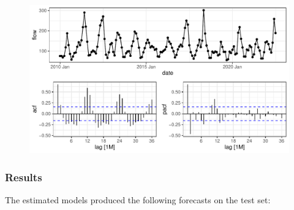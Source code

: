 \documentclass[
  letterpaper,
  DIV=11,
  numbers=noendperiod]{scrartcl}
\let\oldparagraph\paragraph
\renewcommand{\paragraph}[1]{\oldparagraph{#1}\mbox{}}
\begin{document}
\begin{figure}[H]

{\centering \includegraphics{Paper_files/figure-pdf/unnamed-chunk-3-1.pdf}

}

\end{figure}

\hypertarget{results}{%
\subsubsection{Results}\label{results}}

The estimated models produced the following forecasts on the test set:

\hypertarget{section-2}{%
\paragraph{}\label{section-2}}
\end{document}
